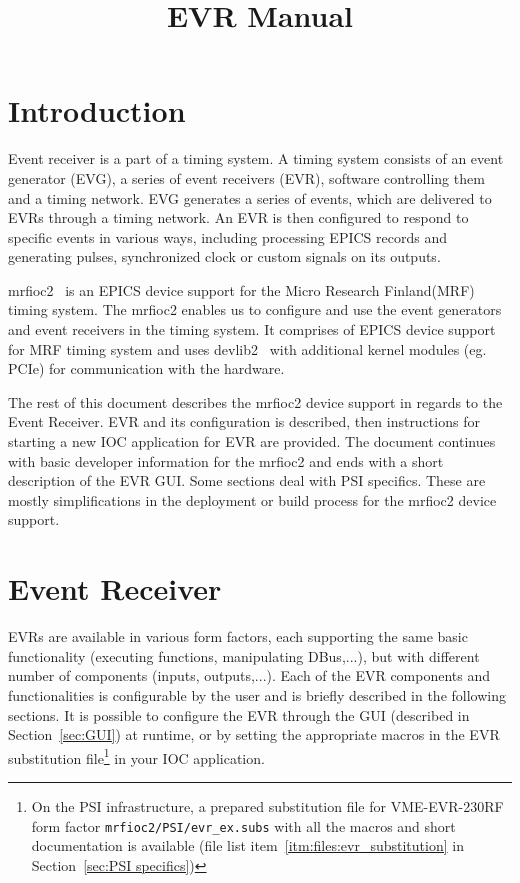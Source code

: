 \documentclass[12pt,a4paper]{article}
\title{EVR Manual}
\date{}
\let\stdsection\section
\renewcommand\section{\newpage\stdsection}
\begin{document}
\maketitle


\tableofcontents


\section{Introduction}\label{sec:Introduction}
Event receiver is a part of a timing system. A timing system consists of an event generator (EVG), a series of event receivers (EVR), software controlling them and a timing network. EVG generates a series of events, which are delivered to EVRs through a timing network. An EVR is then configured to respond to specific events in various ways, including processing EPICS records and generating pulses, synchronized clock or custom signals on its outputs.

mrfioc2~\cite{mrfioc2} is an EPICS device support for the Micro Research Finland(MRF)~\cite{mrf} timing system. The mrfioc2 enables us to configure and use the event generators and event receivers in the timing system. It comprises of EPICS device support for MRF timing system and uses devlib2~\cite{devlib2} with additional kernel modules (eg. PCIe) for communication with the hardware.

The rest of this document describes the mrfioc2 device support in regards to the Event Receiver. EVR and its configuration is described, then instructions for starting a new IOC application for EVR are provided. The document continues with basic developer information for the mrfioc2 and ends with a short description of the EVR GUI. Some sections deal with PSI specifics. These are mostly simplifications in the deployment or build process for the mrfioc2 device support.

\section{Event Receiver}\label{sec:Event Receiver}
EVRs are available in various form factors, each supporting the same basic functionality (executing functions, manipulating DBus,...), but with different number of components (inputs, outputs,...). Each of the EVR components and functionalities is configurable by the user and is briefly described in the following sections. It is possible to configure the EVR through the GUI (described in Section~\ref{sec:GUI}) at runtime, or by setting the appropriate macros in the EVR substitution file\footnote{On the PSI infrastructure, a prepared substitution file for VME-EVR-230RF form factor \texttt{mrfioc2/PSI/evr\_ex.subs} with all the macros and short documentation is available (file list item~\ref{itm:files:evr_substitution} in Section~\ref{sec:PSI specifics})} in your IOC application.
\end{document}
